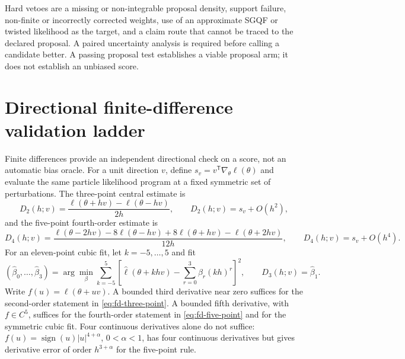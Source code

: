 \documentclass[11pt]{article}
\begin{document}
Hard vetoes are a missing or non-integrable proposal density, support failure,
non-finite or incorrectly corrected weights, use of an approximate SGQF or
twisted likelihood as the target, and a claim route that cannot be traced to the
declared proposal. A paired uncertainty analysis is required before calling a
candidate better. A passing proposal test establishes a viable proposal arm;
it does not establish an unbiased score.

\section{Directional finite-difference validation ladder}
\label{sec:fd-ladder}

Finite differences provide an independent directional check on a score, not an
automatic bias oracle. For a unit direction $v$, define
$s_v=v^\mathsf T\nabla_\theta\ell(\theta)$ and evaluate the same particle
likelihood program at a fixed symmetric set of perturbations. The three-point
central estimate is
\begin{equation}
 D_2(h;v)=\frac{\ell(\theta+hv)-\ell(\theta-hv)}{2h},
 \qquad D_2(h;v)=s_v+O(h^2),
 \label{eq:fd-three-point}
\end{equation}
and the five-point fourth-order estimate is
\begin{equation}
 D_4(h;v)=\frac{\ell(\theta-2hv)-8\ell(\theta-hv)+8\ell(\theta+hv)-\ell(\theta+2hv)}{12h},
 \qquad D_4(h;v)=s_v+O(h^4).                    \label{eq:fd-five-point}
\end{equation}
For an eleven-point cubic fit, let $k=-5,\ldots,5$ and fit
\begin{equation}
 (\widehat\beta_0,\ldots,\widehat\beta_3)
 =\arg\min_\beta\sum_{k=-5}^{5}
 \left[\widehat\ell(\theta+khv)-\sum_{r=0}^{3}\beta_r(kh)^r\right]^2,
 \qquad D_3(h;v)=\widehat\beta_1.              \label{eq:fd-cubic-fit}
\end{equation}
Write $f(u)=\ell(\theta+uv)$. A bounded third derivative near zero suffices
for the second-order statement in \eqref{eq:fd-three-point}. A bounded fifth
derivative, with $f\in C^5$, suffices for the fourth-order statement in
\eqref{eq:fd-five-point} and for the symmetric cubic fit. Four continuous
derivatives alone do not suffice: $f(u)=\operatorname{sign}(u)|u|^{4+\alpha}$,
$0<\alpha<1$, has four continuous derivatives but gives derivative error
of order $h^{3+\alpha}$ for the five-point rule.
\end{document}
